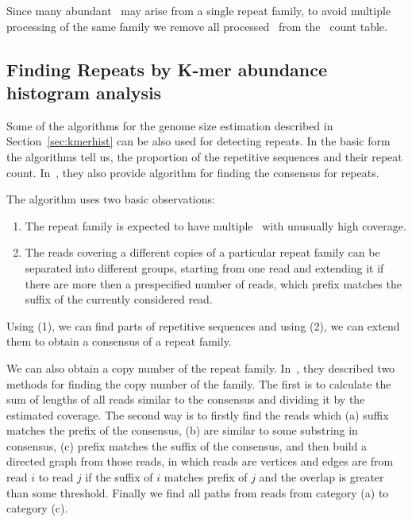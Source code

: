 Since many abundant \kmers\ may arise from a single repeat family, to avoid multiple processing of the same family we remove all processed \kmers\ from the \kmer\ count table.



\subsection{Finding Repeats by K-mer abundance histogram analysis}

Some of the algorithms for the genome size estimation described in Section~\ref{sec:kmerhist} can be also used for detecting repeats.
In the basic form the algorithms tell us, the proportion of the repetitive sequences and their repeat count. In~\cite{waterman}, they also provide algorithm for finding the consensus for repeats.

The algorithm uses two basic observations:

\begin{enumerate}
  \item The repeat family is expected to have multiple \kmers\ with  unusually high coverage.
  \item The reads covering a different copies of a particular repeat family can be separated into different groups, starting from one read and extending it if there are more then a prespecified number of reads, which prefix matches the suffix of the currently considered read.
\end{enumerate}

Using (1), we can find parts of repetitive sequences and using (2), we can extend them to obtain a consensus of a repeat family.

We can also obtain a copy number of the repeat family. In~\cite{waterman}, they described two methods for finding the copy number of the family.
The first is to calculate the sum of lengths of all reads similar to the consensus and dividing it by the estimated coverage.
The second way is to firstly find the reads which (a) suffix matches the prefix of the consensus, (b) are similar to some substring in consensus, (c) prefix matches the suffix of the consensus, and then build a directed graph from those reads, in which reads are vertices and edges are from read $i$ to read $j$ if the suffix of $i$ matches prefix of $j$ and the overlap is greater than some threshold. Finally we find all paths from reads from category (a) to category (c).

